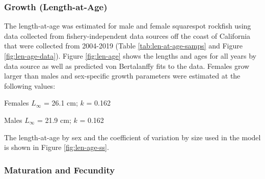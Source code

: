 \documentclass[11pt,
  english,
  a4paper,
]{article}
\begin{document}
\leavevmode\tagmcend\tagstructend\par


\hypertarget{growth-length-at-age}{%
\subsubsection{Growth (Length-at-Age)}\label{growth-length-at-age}}

\leavevmode\tagmcend\tagstructend


The length-at-age was estimated for male and female squarespot rockfish using data collected from fishery-independent data sources off the coast of California that were collected from 2004-2019 (Table \ref{tab:len-at-age-samps} and Figure \ref{fig:len-age-data}). Figure \ref{fig:len-age} shows the lengths and ages for all years by data source as well as predicted von Bertalanffy fits to the data. Females grow larger than males and sex-specific growth parameters were estimated at the following values:

\leavevmode\tagmcend\tagstructend\par

\begin{centering}

Females $L_{\infty}$ = 26.1 cm; $k$ = 0.162

Males $L_{\infty}$ = 21.9 cm; $k$ = 0.162

\end{centering}


The length-at-age by sex and the coefficient of variation by size used in the model is shown in Figure \ref{fig:len-age-ss}.

\leavevmode\tagmcend\tagstructend\par


\hypertarget{maturation-and-fecundity}{%
\subsubsection{Maturation and Fecundity}\label{maturation-and-fecundity}}

\leavevmode\tagmcend\tagstructend

\end{document}
